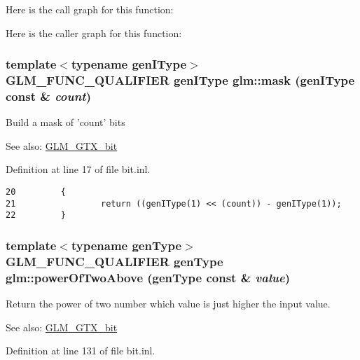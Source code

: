 Here is the call graph for this function:

Here is the caller graph for this function:\hypertarget{group__gtx__bit_g7a909d8e8b8a5f73ed643bdca7602017}{
\subsubsection[mask]{\setlength{\rightskip}{0pt plus 5cm}template$<$typename genIType$>$ GLM\_\-FUNC\_\-QUALIFIER genIType glm::mask (genIType const \& {\em count})}}
\label{group__gtx__bit_g7a909d8e8b8a5f73ed643bdca7602017}


Build a mask of 'count' bits \begin{Desc}
\item[See also:]\hyperlink{group__gtx__bit}{GLM\_\-GTX\_\-bit} \end{Desc}


Definition at line 17 of file bit.inl.

\begin{Code}\begin{verbatim}20         {
21                 return ((genIType(1) << (count)) - genIType(1));
22         }
\end{verbatim}
\end{Code}


\hypertarget{group__gtx__bit_gf27d271ec57b96b6acae9395b9c4a365}{
\subsubsection[powerOfTwoAbove]{\setlength{\rightskip}{0pt plus 5cm}template$<$typename genType$>$ GLM\_\-FUNC\_\-QUALIFIER genType glm::powerOfTwoAbove (genType const \& {\em value})}}
\label{group__gtx__bit_gf27d271ec57b96b6acae9395b9c4a365}


Return the power of two number which value is just higher the input value. \begin{Desc}
\item[See also:]\hyperlink{group__gtx__bit}{GLM\_\-GTX\_\-bit} \end{Desc}


Definition at line 131 of file bit.inl.

